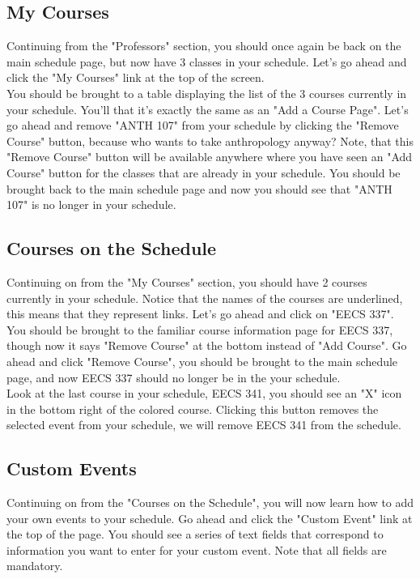\documentclass[pdftex,12pt,letter]{article}
\begin{document}
\subsection{My Courses}
Continuing from the "Professors" section, you should once again be back on the main schedule page, but now have 3 classes in your schedule. Let's go ahead and click the "My Courses" link at the top of the screen.\\

You should be brought to a table displaying the list of the 3 courses currently in your schedule. You'll that it's exactly the same as an "Add a Course Page". Let's go ahead and remove "ANTH 107" from your schedule by clicking the "Remove Course" button, because who wants to take anthropology anyway? Note, that this "Remove Course" button will be available anywhere where you have seen an "Add Course" button for the classes that are already in your schedule. You should be brought back to the main schedule page and now you should see that "ANTH 107" is no longer in your schedule.\\

\subsection{Courses on the Schedule}
Continuing on from the "My Courses" section, you should have 2 courses currently in your schedule. Notice that the names of the courses are underlined, this means that they represent links. Let's go ahead and click on "EECS 337". You should be brought to the familiar course information page for EECS 337, though now it says "Remove Course" at the bottom instead of "Add Course". Go ahead and click "Remove Course", you should be brought to the main schedule page, and now EECS 337 should no longer be in the your schedule.\\

Look at the last course in your schedule, EECS 341, you should see an "X" icon in the bottom right of the colored course. Clicking this button removes the selected event from your schedule, we will remove EECS 341 from the schedule.

\subsection{Custom Events}
Continuing on from the "Courses on the Schedule", you will now learn how to add your own events to your schedule. Go ahead and click the "Custom Event" link at the top of the page. You should see a series of text fields that correspond to information you want to enter for your custom event. Note that all fields are mandatory.\\
\end{document}
